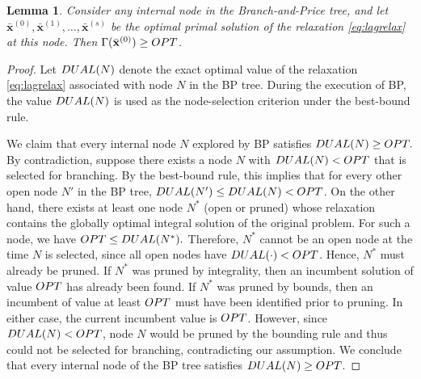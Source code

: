 \documentclass[10pt,a4paper]{amsart}
\newtheorem{lemma}{Lemma}
\newcommand{\LAG}{\textup{DUAL}}
\newcommand{\OPT}{\textup{OPT}}
\newcommand{\xv}[0]{\mathbf{x}}
\begin{document}
\begin{lemma} \label{lemma:bestBound}
    Consider any internal node in the Branch-and-Price tree, and let $\bar{\xv}^{(0)},\bar{\xv}^{(1)},\ldots,\bar{\xv}^{(s)}$ be the optimal primal solution of the relaxation \eqref{eq:lagrelax} at this node. Then $\Gamma(\bar{\xv}^{(0)}) \ge \OPT$.
\end{lemma}

\begin{proof}
Let $\LAG(N)$ denote the exact optimal value of the relaxation
\eqref{eq:lagrelax} associated with node $N$ in the BP tree.
During the execution of BP, the value $\LAG(N)$ is used as the
node-selection criterion under the best-bound rule.

We claim that every internal node $N$ explored by BP satisfies
$\LAG(N) \ge \OPT.$
By contradiction, suppose there exists a node $N$ with
$\LAG(N) < \OPT$ that is selected for branching. By the best-bound
rule, this implies that for every other open node $N'$ in the BP tree, $\LAG(N') \le \LAG(N) < \OPT$.
On the other hand, there exists at least one node $N^*$ (open or pruned) whose
relaxation contains the globally optimal integral solution of the original
problem. For such a node, we have
$\OPT \le \LAG(N^*).$
Therefore, $N^*$ cannot be an open node at the time $N$ is selected, since all
open nodes have $\LAG(\cdot) < \OPT$. Hence, $N^*$ must already be
pruned.
If $N^*$ was pruned by integrality, then an incumbent solution of value $\OPT$
has already been found. If $N^*$ was pruned by bounds, then an incumbent of
value at least $\OPT$ must have been identified prior to pruning. In either
case, the current incumbent value is $\OPT$.
However, since $\LAG(N) < \OPT$, node $N$ would be pruned by the
bounding rule and thus could not be selected for branching, contradicting our
assumption. We conclude that every internal node of the BP tree satisfies
$\LAG(N) \ge \OPT$.


\end{proof}
\end{document}
